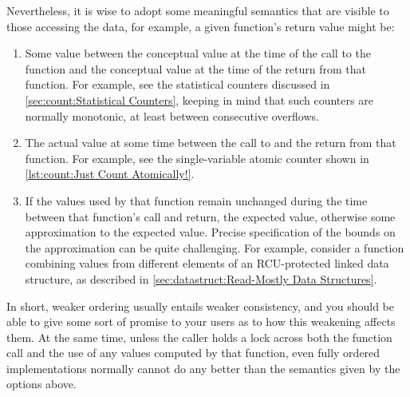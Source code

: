 Nevertheless, it is wise to adopt some meaningful semantics that are
visible to those accessing the data, for example, a given function's
return value might be:

\begin{enumerate}
\item	Some value between the conceptual value at the time of the call
	to the function and the conceptual value at the time of the
	return from that function.
	For example, see the statistical counters discussed in
	\cref{sec:count:Statistical Counters}, keeping in mind that such
	counters are normally monotonic, at least between consecutive
	overflows.
\item	The actual value at some time between the call to and the return
	from that function.
	For example, see the single-variable atomic counter shown in
	\cref{lst:count:Just Count Atomically!}.
\item	If the values used by that function remain unchanged during the
	time between that function's call and return, the expected
	value, otherwise some approximation to the expected value.
	Precise specification of the bounds on the approximation can
	be quite challenging.
	For example, consider a function combining values from
	different elements of an RCU-protected linked data structure,
	as described in \cref{sec:datastruct:Read-Mostly Data Structures}.
\end{enumerate}

In short, weaker ordering usually entails weaker consistency, and
you should be able to give some sort of promise to your users as
to how this weakening affects them.
At the same time, unless the caller holds a lock across both the
function call and the use of any values computed by that function,
even fully ordered implementations normally cannot do any better
than the semantics given by the options above.

\QuickQuizEnd

